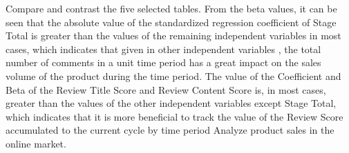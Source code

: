 \documentclass[12pt]{article}
\begin{document}
\par\quad\par\quad\par\quad\par\quad\par\quad\par\quad\par\quad\par\quad\par\quad\par\quad\par
\par\quad\par\quad\par\quad\par\quad\par\quad\par\quad\par\quad\par\quad\par\quad\par\quad\par
\par\quad\par\quad\par\quad\par\quad\par\quad\par\quad\par\quad\par\quad\par\quad\par\quad\par
\par

Compare and contrast the five selected tables. From the beta values, it can be seen that the absolute value of the standardized regression coefficient of Stage Total is greater than the values of the remaining independent variables in most cases, which indicates that given in other independent variables , the total number of comments in a unit time period has a great impact on the sales volume of the product during the time period. The value of the Coefficient and Beta of the Review Title Score and Review Content Score is, in most cases, greater than the values of the other independent variables except Stage Total, which indicates that it is more beneficial to track the value of the Review Score accumulated to the current cycle by time period Analyze product sales in the online market.
\end{document}
